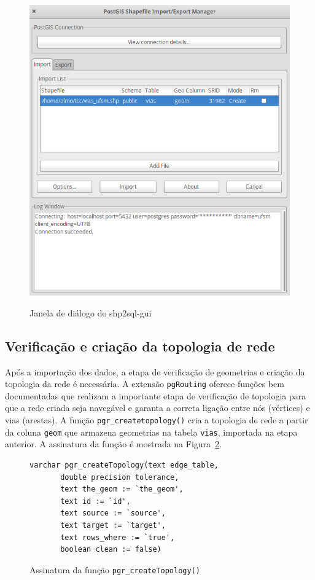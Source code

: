 \documentclass[oneside,openright,12pt]{ufsm_2015} %
\begin{document}
\begin{figure}[h!]
    \caption{Janela de diálogo do shp2sql-gui}
    \centering
    \includegraphics[scale=0.3]{imagens/shp2pgsql.png}
    \label{shp2pgsql}
\end{figure}

\subsection{Verificação e criação da topologia de rede}

Após a importação dos dados, a etapa de verificação de geometrias e criação da topologia da rede é necessária. 
A extensão {\tt pgRouting} oferece funções bem documentadas que realizam a importante etapa de verificação de topologia para que a rede criada seja navegável e garanta a correta ligação entre nós (vértices) e vias (arestas).
A função {\tt pgr\_createtopology()} cria a topologia de rede a partir da coluna  {\tt geom}  que armazena geometrias na tabela {\tt vias}, importada na etapa anterior. 
A assinatura da função é mostrada na Figura~\ref{codigo:create_topology}.

\begin{figure}[h!]
    \centering
     \caption{Assinatura da função {\tt pgr\_createTopology()}}
    \label{codigo:create_topology}
    \begin{lstlisting}
varchar pgr_createTopology(text edge_table, 
       double precision tolerance,
       text the_geom := `the_geom',
       text id := `id',
       text source := `source',
       text target := `target',
       text rows_where := `true',
       boolean clean := false)
\end{lstlisting}
\end{figure}
\end{document}
